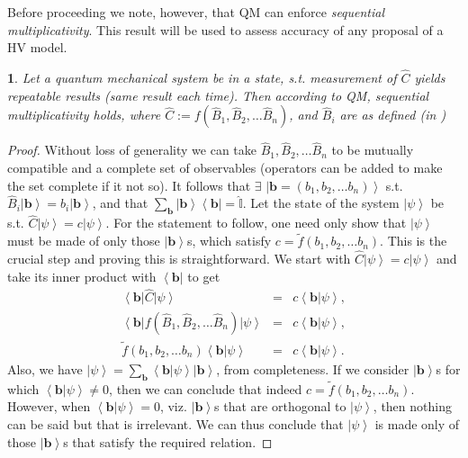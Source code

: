 \documentclass[british,aps,prl,superscriptaddress,nofootinbib,times,reprint]{revtex4-1}
\theoremstyle{plain}
\theoremstyle{plain}
\theoremstyle{definition}
\theoremstyle{remark}
\theoremstyle{remark}
\theoremstyle{remark}
\theoremstyle{plain}
\newtheorem*{prop*}{\protect\propositionname}
\theoremstyle{plain}
\theoremstyle{plain}
\theoremstyle{definition}
\theoremstyle{definition}
\providecommand{\propositionname}{Proposition}
\begin{document}
Before proceeding we note, however, that QM can
enforce \emph{sequential multiplicativity}. This
result will be used to assess accuracy of any
proposal of a HV
model.
\begin{prop*} 
Let a quantum mechanical 
system be in a state, s.t. measurement of
$\hat{C}$ yields repeatable results (same result
each time). Then according to QM, \emph{sequential
multiplicativity} holds, where $\hat{C}:=
f(\hat{B}_{1},\hat{B}_{2},\dots\hat{B}_{n})$, and
$\hat{B}_{i}$ are as defined (in )
\end{prop*}
\begin{proof} 
Without loss of generality we can take
$\hat{B}_{1},\hat{B}_{2},\dots\hat{B}_{n}$ to be
mutually compatible and a complete set of
observables (operators can be added to make the set
complete if it not so).
It follows
that $\exists$
$\left|\mathbf{b}=\left(b_{1},b_{2},\dots
b_{n}\right)\right\rangle $ s.t.
$\hat{B}_{i}\left|\mathbf{b}\right\rangle
=b_{i}\left|\mathbf{b}\right\rangle $,
and that
$\sum_{\mathbf{b}}\left|\mathbf{b}\right\rangle
\left\langle \mathbf{b}\right|=\hat{\mathbb{I}}$.
Let the state of the system
$\left|\psi\right\rangle $ be s.t.
$\hat{C}\left|\psi\right\rangle
=c\left|\psi\right\rangle $. For
the statement to follow, one need only show that
$\left|\psi\right\rangle $ must be made of only
those $\left|\mathbf{b}\right\rangle $s, which
satisfy $c=\tilde
f(b_{1},b_{2},\dots
b_{n})$.  This is the crucial step and
proving this is straightforward. We start with
$\hat{C}\left|\psi\right\rangle
=c\left|\psi\right\rangle $ and take its inner
product with $\left\langle \mathbf{b}\right|$ to
get \begin{eqnarray*} \left\langle
\mathbf{b}\right|\hat{C}\left|\psi\right\rangle  &
= & c\left\langle \mathbf{b}|\psi\right\rangle ,\\
\left\langle
\mathbf{b}\right|f(\hat{B}_{1},\hat{B}_{2},\dots\hat{B}_{n})
\left|\psi\right\rangle
& = & c\left\langle \mathbf{b}|\psi\right\rangle
,\\ \tilde f(b_{1},b_{2},\dots
b_{n})\left\langle
\mathbf{b}|\psi\right\rangle  & = & c\left\langle
\mathbf{b}|\psi\right\rangle .  \end{eqnarray*}
Also, we have $\left|\psi\right\rangle
=\sum_{\mathbf{b}}\left\langle
\mathbf{b}|\psi\right\rangle
\left|\mathbf{b}\right\rangle $, from
completeness. If we consider
$\left|\mathbf{b}\right\rangle $s for which
$\left\langle \mathbf{b}|\psi\right\rangle \neq0$,
then we can conclude that indeed $c=\tilde
f(b_{1},b_{2},\dots
b_{n})$. However, when $\left\langle
\mathbf{b}|\psi\right\rangle =0$, viz.
$\left|\mathbf{b}\right\rangle $s that are
orthogonal to $\left|\psi\right\rangle $, then
nothing can be said but that is irrelevant. We can thus conclude that
$\left|\psi\right\rangle $ is made only of those
$\left|\mathbf{b}\right\rangle $s that satisfy the
required relation.
\end{proof} 
\end{document}
